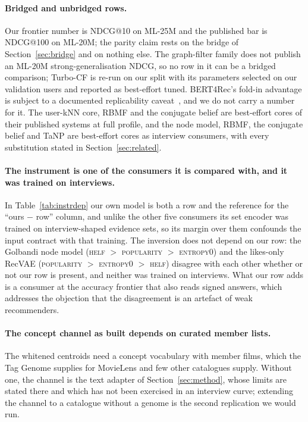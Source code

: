 \documentclass[manuscript,screen]{acmart}
\begin{document}
\paragraph{Bridged and unbridged rows.} Our frontier number is NDCG@10 on ML-25M and the published bar is NDCG@100 on ML-20M; the parity claim rests on the bridge of Section~\ref{sec:bridge} and on nothing else. The graph-filter family does not publish an ML-20M strong-generalisation NDCG, so no row in it can be a bridged comparison; Turbo-CF is re-run on our split with its parameters selected on our validation users and reported as best-effort tuned. BERT4Rec's fold-in advantage is subject to a documented replicability caveat~\citep{petrov2022replicability}, and we do not carry a number for it. The user-kNN core, RBMF and the conjugate belief are best-effort cores of their published systems at full profile, and the node model, RBMF, the conjugate belief and TaNP are best-effort cores as interview consumers, with every substitution stated in Section~\ref{sec:related}.

\paragraph{The instrument is one of the consumers it is compared with, and it was trained on interviews.} In Table~\ref{tab:instrdep} our own model is both a row and the reference for the ``ours $-$ row'' column, and unlike the other five consumers its set encoder was trained on interview-shaped evidence sets, so its margin over them confounds the input contract with that training. The inversion does not depend on our row: the Golbandi node model (\textsc{helf} $>$ \textsc{popularity} $>$ \textsc{entropy0}) and the likes-only RecVAE (\textsc{popularity} $>$ \textsc{entropy0} $>$ \textsc{helf}) disagree with each other whether or not our row is present, and neither was trained on interviews. What our row adds is a consumer at the accuracy frontier that also reads signed answers, which addresses the objection that the disagreement is an artefact of weak recommenders.

\paragraph{The concept channel as built depends on curated member lists.} The whitened centroids need a concept vocabulary with member films, which the Tag Genome supplies for MovieLens and few other catalogues supply. Without one, the channel is the text adapter of Section~\ref{sec:method}, whose limits are stated there and which has not been exercised in an interview curve; extending the channel to a catalogue without a genome is the second replication we would run.
\end{document}
